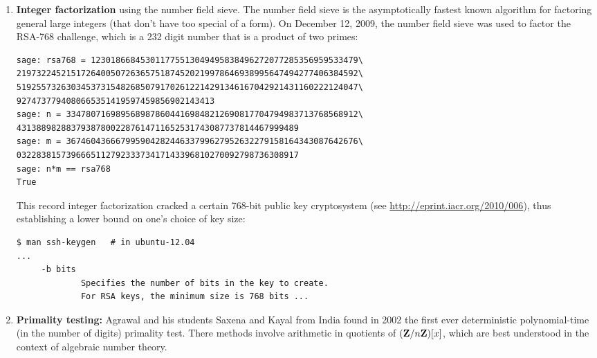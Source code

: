 \begin{enumerate}
\item {\bf Integer factorization} using the number field sieve.  The
number field sieve is the asymptotically fastest known algorithm for
factoring general large integers (that don't have too special of a
form).  On December 12, 2009, the number field sieve was used to
factor the RSA-768 challenge, which is a 232 digit number that is a product of two primes:\\
\begin{lstlisting}
sage: rsa768 = 123018668453011775513049495838496272077285356959533479\
219732245215172640050726365751874520219978646938995647494277406384592\
519255732630345373154826850791702612214291346167042921431160222124047\
9274737794080665351419597459856902143413
sage: n = 33478071698956898786044169848212690817704794983713768568912\
431388982883793878002287614711652531743087737814467999489
sage: m = 36746043666799590428244633799627952632279158164343087642676\
032283815739666511279233373417143396810270092798736308917
sage: n*m == rsa768
True
\end{lstlisting}

This record integer factorization cracked a certain 768-bit public key
cryptosystem (see \url{http://eprint.iacr.org/2010/006}), thus
establishing a lower bound on one's choice of key size:
\begin{verbatim}
$ man ssh-keygen   # in ubuntu-12.04
...
     -b bits
             Specifies the number of bits in the key to create.  
             For RSA keys, the minimum size is 768 bits ...
\end{verbatim}


\item {\bf Primality testing:} Agrawal and his students Saxena and Kayal from
India found in 2002 the first ever deterministic
polynomial-time (in the number of digits) primality test.  There
methods involve arithmetic in quotients of $(\mathbf{Z}/n\mathbf{Z})[x]$, which are
best understood in the context of algebraic number theory.  


\end{enumerate}
